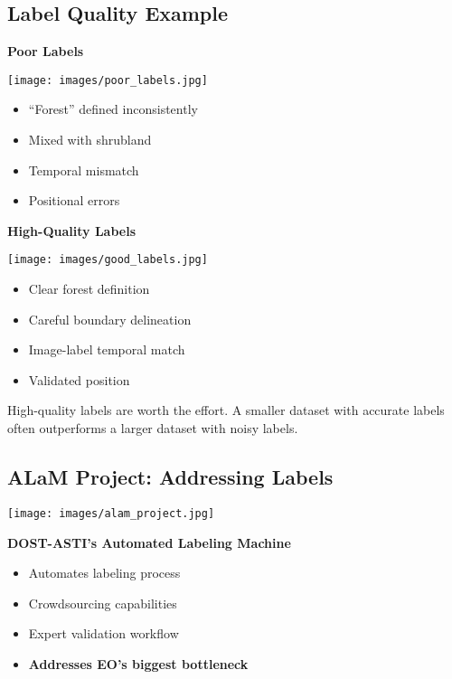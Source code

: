 \documentclass[
  letterpaper,
  DIV=11,
  numbers=noendperiod]{scrartcl}
\providecommand{\tightlist}{%
  \setlength{\itemsep}{0pt}\setlength{\parskip}{0pt}}
\begin{document}
\subsection{Label Quality Example}\label{label-quality-example}

\textbf{Poor Labels}

\texttt{[image: images/poor\_labels.jpg]}

\begin{itemize}
\tightlist
\item
  ``Forest'' defined inconsistently
\item
  Mixed with shrubland
\item
  Temporal mismatch
\item
  Positional errors
\end{itemize}

\textbf{High-Quality Labels}

\texttt{[image: images/good\_labels.jpg]}

\begin{itemize}
\tightlist
\item
  Clear forest definition
\item
  Careful boundary delineation
\item
  Image-label temporal match
\item
  Validated position
\end{itemize}

High-quality labels are worth the effort. A smaller dataset with
accurate labels often outperforms a larger dataset with noisy labels.

\subsection{ALaM Project: Addressing
Labels}\label{alam-project-addressing-labels}

\begin{center}
\texttt{[image: images/alam\_project.jpg]}
\end{center}

\textbf{DOST-ASTI's Automated Labeling Machine}

\begin{itemize}
\tightlist
\item
  Automates labeling process
\item
  Crowdsourcing capabilities
\item
  Expert validation workflow
\item
  \textbf{Addresses EO's biggest bottleneck}
\end{itemize}
\end{document}
